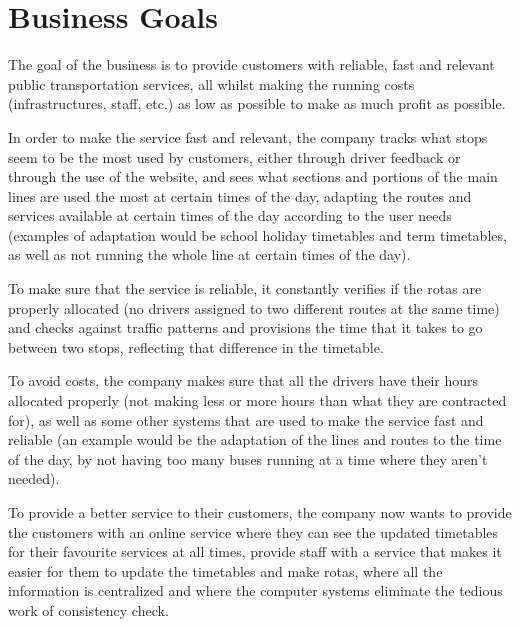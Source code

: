 \section{Business Goals}
The goal of the business is to provide customers with reliable, fast and relevant public transportation services,
all whilst making the running costs (infrastructures, staff, etc.) as low as possible to make as much profit as possible.

In order to make the service fast and relevant, the company tracks what stops seem to be the most used by customers,
either through driver feedback or through the use of the website, and sees what sections and portions of the main lines 
are used the most at certain times of the day, adapting the routes and services available at certain times of the day according 
to the user needs (examples of adaptation would be school holiday timetables and term timetables, as well as not running the 
whole line at certain times of the day).

To make sure that the service is reliable, it constantly verifies if the rotas are properly allocated (no drivers assigned to two different 
routes at the same time) and checks against traffic patterns and provisions the time that it takes to go between two stops, reflecting
that difference in the timetable.

To avoid costs, the company makes sure that all the drivers have their hours allocated properly (not making less or more hours than 
what they are contracted for), as well as some other systems that are used to make the service fast and reliable (an example would be 
the adaptation of the lines and routes to the time of the day, by not having too many buses running at a time where they aren't needed).

To provide a better service to their customers, the company now wants to provide the customers with an online service where they can see 
the updated timetables for their favourite services at all times, provide staff with a service that makes it easier for them to update the timetables 
and make rotas, where all the information is centralized and where the computer systems eliminate the tedious work of consistency check.